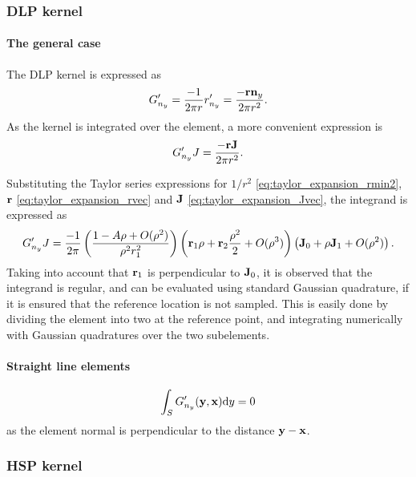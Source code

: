\subsubsection{DLP kernel}

\paragraph{The general case}

The DLP kernel is expressed as
%
\begin{equation}
	G'_{n_y} = \frac{-1}{2\pi r} r'_{n_y}
	= \frac{-{\bf r} {\bf n}_y}{2\pi r^2} 
	.
\end{equation}
%
As the kernel is integrated over the element, a more convenient expression is
%
\begin{equation}
	G'_{n_y} J = \frac{-{\bf r} {\bf J}}{2\pi r^2} 
	.
\end{equation}

Substituting the Taylor series expressions for $1/r^2$ \eqref{eq:taylor_expansion_rmin2}, ${\bf r}$ \eqref{eq:taylor_expansion_rvec} and ${\bf J}$ \eqref{eq:taylor_expansion_Jvec}, the integrand is expressed as
%
\begin{equation}
	G'_{n_y} J = \frac{-1}{2\pi} \left(\frac{1-A\rho + O(\rho^2)}{\rho^2 r_1^2}\right) 
	\left( {\bf r}_1 \rho + {\bf r}_2 \frac{\rho^2}{2} + O(\rho^3) \right) 
	\left( {\bf J}_0 + \rho {\bf J}_1 + O(\rho^2) \right)
	.
\end{equation}
%
Taking into account that ${\bf r}_1$ is perpendicular to ${\bf J}_0$, it is observed that the integrand is regular, and can be evaluated using standard Gaussian quadrature, if it is ensured that the reference location is not sampled.
This is easily done by dividing the element into two at the reference point, and integrating numerically with Gaussian quadratures over the two subelements.


\paragraph{Straight line elements}

\begin{equation}
\int_{S} G'_{n_y}({\bf y}, {\bf x}) \mathrm{d} y = 0
\end{equation}
%
as the element normal is perpendicular to the distance ${\bf y}-{\bf x}$.



\subsubsection{HSP kernel}

